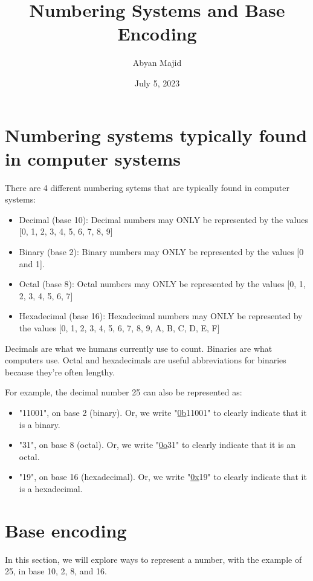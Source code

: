 \documentclass{article}
\begin{document}
\title{Numbering Systems and Base Encoding}
\author{Abyan Majid}
\date{July 5, 2023}
\maketitle

\section{Numbering systems typically found in computer systems}

There are 4 different numbering sytems that are typically found in computer systems:

\begin{itemize}
    \item Decimal (base 10): Decimal numbers may ONLY be represented by the values [0, 1, 2, 3, 4, 5, 6, 7, 8, 9]
    \item Binary (base 2): Binary numbers may ONLY be represented by the values [0 and 1].
    \item Octal (base 8): Octal numbers may ONLY be represented by the values [0, 1, 2, 3, 4, 5, 6, 7]
    \item Hexadecimal (base 16): Hexadecimal numbers may ONLY be represented by the values [0, 1, 2, 3, 4, 5, 6, 7, 8, 9, A, B, C, D, E, F]
\end{itemize}

\begin{center}
    Decimals are what we humans currently use to count. Binaries are what computers use. Octal and hexadecimals are useful abbreviations for binaries because they're often lengthy.
\end{center}

\noindent\hrulefill

\noindent For example, the decimal number 25 can also be represented as:

\begin{itemize}
    \item "11001", on base 2 (binary). Or, we write "\underline{0b}11001" to clearly indicate that it is a binary.
    \item "31", on base 8 (octal). Or, we write "\underline{0o}31" to clearly indicate that it is an octal.
    \item "19", on base 16 (hexadecimal). Or, we write "\underline{0x}19" to clearly indicate that it is a hexadecimal.
\end{itemize}

\section{Base encoding}
In this section, we will explore ways to represent a number, with the example of 25, in base 10, 2, 8, and 16.
\end{document}
